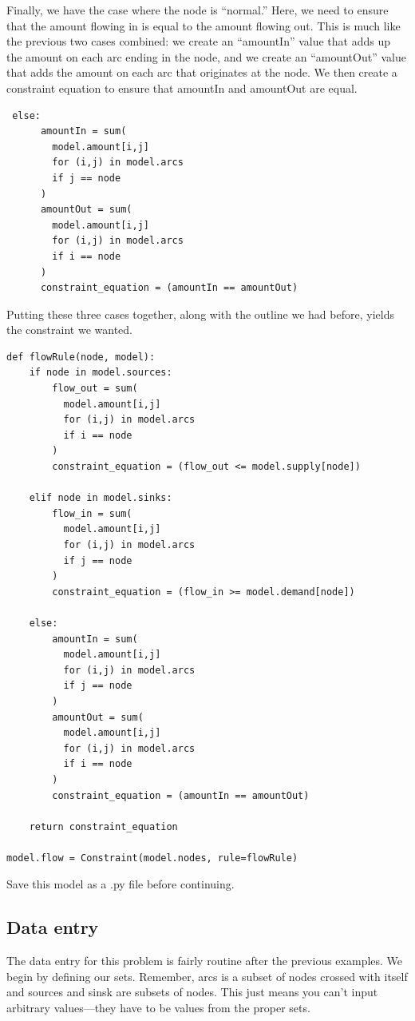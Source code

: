 \documentclass{article}
\begin{document}
Finally, we have the case where the node is ``normal.''  Here, we need to ensure that the amount flowing in is equal to the amount flowing out.  This is much like the previous two cases combined: we create an ``amountIn'' value that adds up the amount on each arc ending in the node, and we create an ``amountOut'' value that adds the amount on each arc that originates at the node.  We then create a constraint equation to ensure that amountIn and amountOut are equal.

\begin{verbatim}
 else:
      amountIn = sum(
        model.amount[i,j] 
        for (i,j) in model.arcs 
        if j == node
      )
      amountOut = sum(
        model.amount[i,j] 
        for (i,j) in model.arcs 
        if i == node
      )
      constraint_equation = (amountIn == amountOut)
\end{verbatim}

Putting these three cases together, along with the outline we had before, yields the constraint we wanted.

\begin{verbatim}
def flowRule(node, model):
    if node in model.sources:
        flow_out = sum(
          model.amount[i,j] 
          for (i,j) in model.arcs 
          if i == node
        )
        constraint_equation = (flow_out <= model.supply[node])
    
    elif node in model.sinks:
        flow_in = sum(
          model.amount[i,j]
          for (i,j) in model.arcs
          if j == node
        )
        constraint_equation = (flow_in >= model.demand[node])
    
    else:
        amountIn = sum(
          model.amount[i,j] 
          for (i,j) in model.arcs 
          if j == node
        )
        amountOut = sum(
          model.amount[i,j] 
          for (i,j) in model.arcs 
          if i == node
        )
        constraint_equation = (amountIn == amountOut)
        
    return constraint_equation
    
model.flow = Constraint(model.nodes, rule=flowRule)
\end{verbatim}

Save this model as a .py file before continuing.

\subsection*{Data entry}

The data entry for this problem is fairly routine after the previous examples.  We begin by defining our sets.  Remember, arcs is a subset of nodes crossed with itself and sources and sinsk are subsets of nodes.  This just means you can't input arbitrary values---they have to be values from the proper sets.
\end{document}
